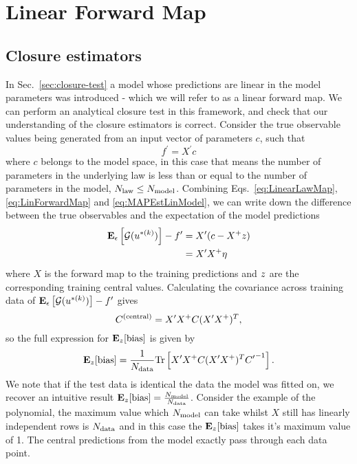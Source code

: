\section{Linear Forward Map}

\subsection{Closure estimators}

In Sec.~\ref{sec:closure-test} a model whose predictions are linear in the
model parameters was introduced - which we will refer to as a linear forward map.
We can perform an analytical closure test in this framework, and check that our
understanding of the closure estimators is correct. Consider the true observable
values being generated from an input vector of parameters $c$, such that
\begin{equation}\label{eq:LinearLawMap}
    f^\prime = X^\prime c
\end{equation}
where $c$ belongs to the model space, in this case that means the number of parameters
in the underlying law is less than or equal to the number of parameters in the
model, $N_{\rm law} \leq N_{\rm model}$. Combining Eqs.~\ref{eq:LinearLawMap},
\ref{eq:LinForwardMap} and \ref{eq:MAPEstLinModel}, we can write down the
difference between the true observables and the expectation of the model
predictions
\begin{equation}
    \begin{split}
        \mathbf{E}_{\epsilon}\left[ \mathcal{G}(u^{* (k)}) \right] - f^\prime &= X^\prime (c - X^+ z ) \\
        &= X^\prime X^+ \eta
    \end{split}
\end{equation}
where $X$ is the forward map to the training predictions and $z$ are
the corresponding training central values. Calculating the covariance across
training data of $\mathbf{E}_{\epsilon}\left[ \mathcal{G}(u^{* (k)}) \right] - f^\prime$ gives
\begin{equation}
    C^{(\rm central)} = X^\prime X^+ C(X^\prime X^+)^T,
\end{equation}
so the full expression for $\mathbf{E}_{z}[{\rm bias}]$ is given by
\begin{equation}
    \mathbf{E}_{z}[{\rm bias}] = \frac{1}{N_{\rm data}}
    {\rm Tr} \left[ X^\prime X^+ C (X^\prime X^+)^T {C^{\prime}}^{-1} \right].
\end{equation}
We note that if the test data is identical the data the model was fitted on,
we recover an intuitive result $\mathbf{E}_{z}[{\rm bias}] = \frac{N_{\rm model}}{N_{\rm data}}$.
Consider the example of the polynomial, the maximum value which $N_{\rm model}$ can
take whilst $X$ still has linearly independent rows is $N_{\rm data}$ and in this case
the $\mathbf{E}_{z}[{\rm bias}]$ takes it's maximum value of 1. The central
predictions from the model exactly pass through each data point.

